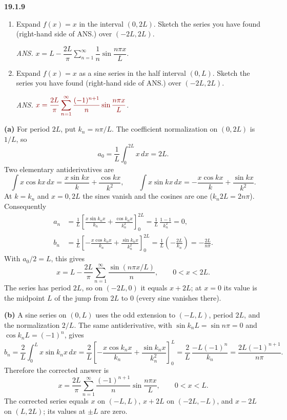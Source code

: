 \par\bigskip
\noindent\textbf{19.1.9}
\begin{enumerate}
\item[(a)] Expand $f(x)=x$ in the interval $(0,2L)$. Sketch the
series you have found (right-hand side of ANS.) over $(-2L,2L)$.
\par\nobreak\hfill\emph{ANS.}\enspace
$x=L-\dfrac{2L}{\pi}\displaystyle\sum_{n=1}^{\infty}
\dfrac{1}{n}\sin\dfrac{n\pi x}{L}$.
\item[(b)] Expand $f(x)=x$ as a sine series in the half interval
$(0,L)$. Sketch the series you have found (right-hand side of
ANS.) over $(-2L,2L)$.
\par\nobreak\hfill\emph{ANS.}\enspace
$\erratum{x=\dfrac{2L}{\pi}\displaystyle\sum_{n=1}^{\infty}
\dfrac{(-1)^{n+1}}{n}\sin\dfrac{n\pi x}{L}}$.
\end{enumerate}
\solution
\textbf{(a)} For period $2L$, put $k_n=n\pi/L$. The coefficient
normalization on $(0,2L)$ is $1/L$, so
\[
a_0=\frac1L\int_0^{2L}x\,dx=2L.
\]
Two elementary antiderivatives are
\[
\int x\cos kx\,dx=\frac{x\sin kx}{k}+\frac{\cos kx}{k^2},
\qquad
\int x\sin kx\,dx=-\frac{x\cos kx}{k}+\frac{\sin kx}{k^2}.
\]
At $k=k_n$ and $x=0,2L$ the sines vanish and the cosines are one
($k_n2L=2n\pi$). Consequently
\begin{align*}
a_n&=\frac1L\left[\frac{x\sin k_nx}{k_n}
+\frac{\cos k_nx}{k_n^2}\right]_0^{2L}
=\frac1L\,\frac{1-1}{k_n^2}=0,\\
b_n&=\frac1L\left[-\frac{x\cos k_nx}{k_n}
+\frac{\sin k_nx}{k_n^2}\right]_0^{2L}
=\frac1L\left(-\frac{2L}{k_n}\right)=-\frac{2L}{n\pi}.
\end{align*}
With $a_0/2=L$, this gives
\[
\boxed{x=L-\frac{2L}{\pi}\sum_{n=1}^{\infty}\frac{\sin(n\pi x/L)}n,
\qquad0<x<2L.}
\]
The series has period $2L$, so on $(-2L,0)$ it equals $x+2L$; at $x=0$
its value is the midpoint $L$ of the jump from $2L$ to $0$ (every sine
vanishes there).

\textbf{(b)} A sine series on $(0,L)$ uses the odd extension to
$(-L,L)$, period $2L$, and the normalization $2/L$. The same
antiderivative, with $\sin k_nL=\sin n\pi=0$ and
$\cos k_nL=(-1)^n$, gives
\[
b_n=\frac2L\int_0^Lx\sin k_nx\,dx
=\frac2L\left[-\frac{x\cos k_nx}{k_n}
+\frac{\sin k_nx}{k_n^2}\right]_0^L
=\frac2L\,\frac{-L(-1)^n}{k_n}
=\frac{2L(-1)^{n+1}}{n\pi}.
\]
Therefore the corrected answer is
\[
\boxed{x=\frac{2L}{\pi}\sum_{n=1}^{\infty}
\frac{(-1)^{n+1}}n\sin\frac{n\pi x}{L},\qquad0<x<L.}
\]
The corrected series equals $x$ on $(-L,L)$, $x+2L$ on $(-2L,-L)$,
and $x-2L$ on $(L,2L)$; its values at $\pm L$ are zero.

